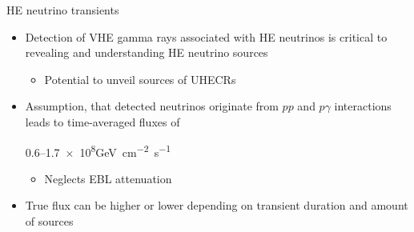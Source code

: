 \begin{frame}{HE neutrino transients}
  \begin{itemize}
    \item Detection of VHE gamma rays associated with HE neutrinos is critical to revealing and understanding HE neutrino sources
    \begin{itemize}
      \item [\to] Potential to unveil sources of UHECRs
    \end{itemize}
    \item Assumption, that detected neutrinos originate from $pp$ and $p\gamma$ interactions leads to time-averaged fluxes of
    \begin{center}
      \numrange{0.6}{1.7e8}\si{\giga\eV\centi\meter^{-2}\second^{-1}}
    \end{center}
    \begin{itemize}
      \item [\to] Neglects EBL attenuation
    \end{itemize}
    \item True flux can be higher or lower depending on transient duration and amount of sources
  \end{itemize}
\end{frame}

